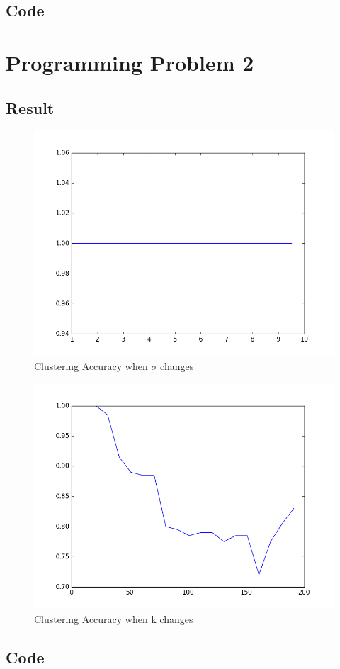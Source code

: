 \documentclass[]{article}
\begin{document}
    \subsection{Code}
    
    
    \section{Programming Problem 2}
    \subsection{Result}
    \begin{figure}[H]
        \centering
        \includegraphics[scale=0.5]{PP2_sigma.png}
        \caption{Clustering Accuracy when $\sigma$ changes}
    \end{figure}
    \begin{figure}[H]
        \centering
        \includegraphics[scale=0.5]{PP2_k.png}
        \caption{Clustering Accuracy when k changes}
    \end{figure}
    \subsection{Code}
    
\end{document}

